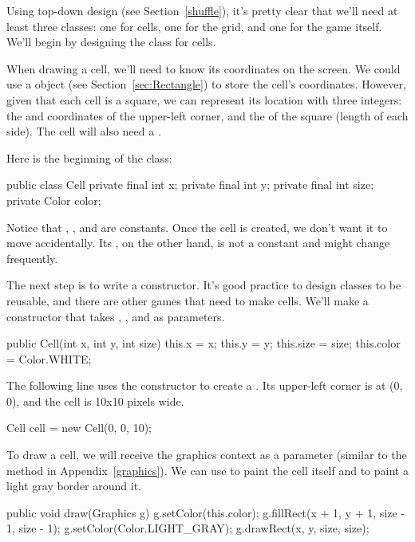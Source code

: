 Using top-down design (see Section~\ref{shuffle}), it's pretty clear that we'll need at least three classes: one for cells, one for the grid, and one for the game itself.
We'll begin by designing the class for cells.

When drawing a cell, we'll need to know its coordinates on the screen.
We could use a  object (see Section~\ref{sec:Rectangle}) to store the cell's coordinates.
However, given that each cell is a square, we can represent its location with three integers: the  and  coordinates of the upper-left corner, and the  of the square (length of each side).
The cell will also need a .

Here is the beginning of the  class:

\begin{code}
public class Cell {
    private final int x;
    private final int y;
    private final int size;
    private Color color;
}
\end{code}

Notice that , , and  are constants.
Once the cell is created, we don't want it to move accidentally.
Its , on the other hand, is not a constant and might change frequently.

The next step is to write a constructor.
It's good practice to design classes to be reusable, and there are other games that need to make cells.
We'll make a constructor that takes , , and  as parameters.

\begin{code}
public Cell(int x, int y, int size) {
    this.x = x;
    this.y = y;
    this.size = size;
    this.color = Color.WHITE;
}
\end{code}

The following line uses the constructor to create a .
Its upper-left corner is at (0, 0), and the cell is 10x10 pixels wide.

\begin{code}
Cell cell = new Cell(0, 0, 10);
\end{code}

To draw a cell, we will receive the graphics context as a parameter (similar to the  method in Appendix~\ref{graphics}).
We can use  to paint the cell itself and  to paint a light gray border around it.

\begin{code}
public void draw(Graphics g) {
    g.setColor(this.color);
    g.fillRect(x + 1, y + 1, size - 1, size - 1);
    g.setColor(Color.LIGHT_GRAY);
    g.drawRect(x, y, size, size);
}
\end{code}

